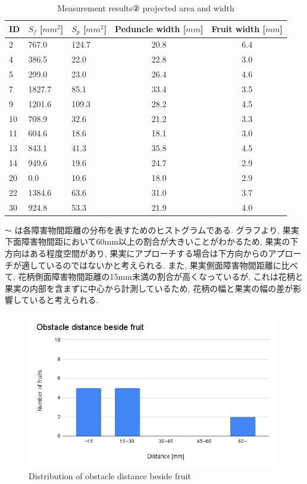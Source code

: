 \begin{table}[H]
  \begin{center}
    \begin{tabular}{l|p{30mm}p{30mm}cc}
      ID & $S_f$ [$mm^2$] & $S_p$ [$mm^2$] & Peduncle width [$mm$] & Fruit width [$mm$]\\ \hline\hline
      2 & 767.0 & 124.7 & 20.8 & 6.4\\
      4 & 386.5 & 22.0 & 22.8 & 3.0\\
      5 & 299.0 & 23.0 & 26.4 & 4.6\\
      7 & 1827.7 & 85.1 & 33.4 & 3.5\\
      9 & 1201.6 & 109.3 & 28.2 & 4.5\\
      10 & 708.9 & 32.6 & 21.2 & 3.3\\
      11 & 604.6 & 18.6 & 18.1 & 3.0\\
      13 & 843.1 & 41.3 & 35.8 & 4.5\\
      14 & 949.6 & 19.6 & 24.7 & 2.9\\
      20 & 0.0 & 10.6 & 18.0 & 2.9\\
      22 & 1384.6 & 63.6 & 31.0 & 3.7\\
      30 & 924.8 & 53.3 & 21.9 & 4.0\\
    \end{tabular}
    \caption{Measurement results② projected area and width}
    \label{Tab:measurementresults2}
  \end{center}
\end{table}

 \verb|〜|  は各障害物間距離の分布を表すためのヒストグラムである.
グラフより, 果実下面障害物間距において60mm以上の割合が大きいことがわかるため, 果実の下方向はある程度空間があり, 果実にアプローチする場合は下方向からのアプローチが適しているのではないかと考えられる.
また, 果実側面障害物間距離に比べて, 花柄側面障害物間距離の15mm未満の割合が高くなっているが, これは花柄と果実の内部を含まずに中心から計測しているため, 花柄の幅と果実の幅の差が影響していると考えられる.

\vspace{5mm}
\begin{figure}[H]
     \centering
     \includegraphics[width=110mm]{images/png/resultbesidef.png}
     \caption{Distribution of obstacle distance beside fruit}
     \label{Fig:resultbesidef}
\end{figure}

